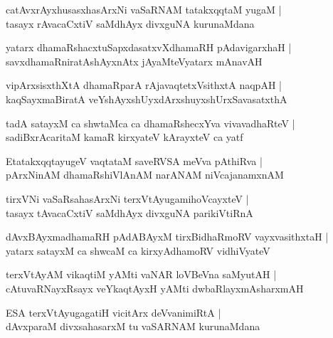 \begin{shloka}
catAvxrAyxhusasxhasArxNi vaSaRNAM tatakxqqtaM yugaM |\\
tasayx rAvacaCxtiV saMdhAyx divxguNA kurunaMdana
\end{shloka}

\begin{shloka}
yatarx dhamaRshacxtuSapxdasatxvXdhamaRH pAdavigarxhaH |\\
savxdhamaRniratAshAyxnAtx jAyaMteVyatarx mAnavAH 
\end{shloka}

\begin{shloka}
vipArxsisxthXtA dhamaRparA rAjavaqtetxVsithxtA naqpAH |\\
kaqSayxmaBiratA veYshAyxshUyxdArxshuyxshUrxSavasatxthA 
\end{shloka}

\begin{shloka}
tadA satayxM ca shwtaMca ca dhamaRshecxYva vivavadhaRteV |\\
sadiBxrAcaritaM kamaR kirxyateV  kArayxteV ca yatf 
\end{shloka}

\begin{shloka}
EtatakxqqtayugeV vaqtataM saveRVSA meVva pAthiRva |\\
pArxNinAM dhamaRshiVlAnAM narANAM niVcajanamxnAM 
\end{shloka}

\begin{shloka}
tirxVNi vaSaRsahasArxNi terxVtAyugamihoVcayxteV |\\
tasayx tAvacaCxtiV saMdhAyx divxguNA parikiVtiRnA 
\end{shloka}

\begin{shloka}
dAvxBAyxmadhamaRH pAdABAyxM tirxBidhaRmoRV vayxvasithxtaH |\\
yatarx satayxM ca shwcaM ca kirxyAdhamoRV vidhiVyateV 
\end{shloka}

\begin{shloka}
terxVtAyAM vikaqtiM yAMti vaNAR loVBeVna saMyutAH |\\
cAtuvaRNayxRsayx veYkaqtAyxH yAMti dwbaRlayxmAsharxmAH 
\end{shloka}

\begin{shloka}
ESA terxVtAyugagatiH vicitArx deVvanimiRtA |\\
dAvxparaM divxsahasarxM tu vaSARNAM kurunaMdana
\end{shloka}

